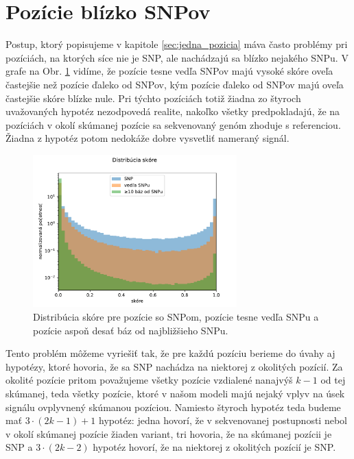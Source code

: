 \section{Pozície blízko SNPov}
\label{sec:blizke_pozicie}

Postup, ktorý popisujeme v kapitole \ref{sec:jedna_pozicia} máva často problémy pri pozíciách, na ktorých síce nie je SNP, ale nachádzajú
sa blízko nejakého SNPu. V grafe na Obr. \ref{fig:score_by_SNP_proximity} vidíme, že pozície tesne vedľa SNPov majú vysoké skóre
oveľa častejšie než pozície ďaleko od SNPov, kým pozície ďaleko od SNPov majú oveľa častejšie skóre blízke nule.
Pri týchto pozíciách totiž žiadna zo štyroch uvažovaných hypotéz nezodpovedá realite, nakoľko všetky predpokladajú,
že na pozíciách v okolí skúmanej pozície sa sekvenovaný genóm zhoduje s referenciou.
Žiadna z hypotéz potom nedokáže dobre vysvetliť nameraný signál.

\begin{figure}
\centerline{\includegraphics[width=0.7\textwidth]{plots/1_windowed_eqbins}}
\caption[Skóre pozícií so SNPom, vedľa SNPu a ďaleko od SNPu]{Distribúcia skóre pre pozície so SNPom, pozície tesne vedľa SNPu a pozície aspoň desať báz od najbližšieho SNPu.}
\label{fig:score_by_SNP_proximity}
\end{figure}

Tento problém môžeme vyriešiť tak, že pre každú pozíciu berieme do úvahy aj hypotézy, ktoré hovoria, že 
sa SNP nachádza na niektorej z okolitých pozícií. Za okolité pozície pritom považujeme všetky pozície
vzdialené nanajvýš $k-1$ od tej skúmanej, teda všetky pozície, ktoré v našom modeli majú nejaký vplyv
na úsek signálu ovplyvnený skúmanou pozíciou.
Namiesto štyroch hypotéz teda budeme mať $3 \cdot (2k-1) + 1$ hypotéz: jedna hovorí, že v sekvenovanej 
postupnosti nebol v okolí skúmanej pozície žiaden variant, tri hovoria, že na skúmanej pozícii je SNP a
$3 \cdot (2k-2)$ hypotéz hovorí, že na niektorej z okolitých pozícií je SNP.

